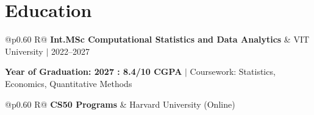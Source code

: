 \documentclass[a4paper,10pt]{article}
\newcommand{\subheading}[1]{{\color[HTML]{0A0A0A}\fontsize{12}{14}\selectfont\bfseries #1}}
\newcommand{\meta}[1]{{\color[HTML]{5C5C5C}\fontsize{10.5}{12.5}\selectfont #1}}
\begin{document}
\section{Education}
\vspace{2pt}

\begin{tabularx}{\linewidth}{@{}p{0.60\linewidth} R@{}}
\subheading{Int.MSc Computational Statistics and Data Analytics} & \meta{VIT University $|$ 2022--2027}
\end{tabularx}
{\color[HTML]{3A3A3A}\fontsize{11}{14}\selectfont \textbf{Year of Graduation: 2027 : 8.4/10 CGPA} $|$ Coursework: Statistics, Economics, Quantitative Methods}

\begin{tabularx}{\linewidth}{@{}p{0.60\linewidth} R@{}}
\subheading{CS50 Programs} & \meta{Harvard University (Online)}
\end{tabularx}
\end{document}
